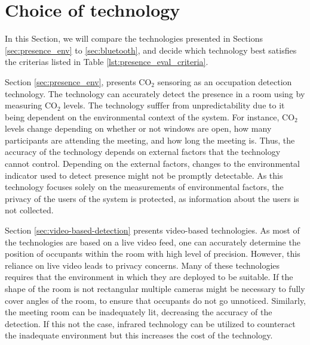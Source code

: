 \section{Choice of technology}
In this Section, we will compare the technologies presented in Sections \ref{sec:presence_env} to \ref{sec:bluetooth}, and decide which technology best satisfies the criterias listed in Table \ref{lst:presence_eval_criteria}. 

Section \ref{sec:presence_env}, presents $\text{CO}_{2}$ sensoring as an occupation detection technology. The technology can accurately detect the presence in a room using by measuring $\text{CO}_{2}$ levels.
The technology sufffer from unpredictability due to it being dependent on the environmental context of the system.
For instance, $\text{CO}_{2}$ levels change depending on whether or not windows are open, how many participants are attending the meeting, and how long the meeting is.
Thus, the accuracy of the technology depends on external factors that the technology cannot control.
Depending on the external factors, changes to the environmental indicator used to detect presence might not be promptly detectable.
As this technology focuses solely on the measurements of environmental factors, the privacy of the users of the system is protected, as information about the users is not collected.

Section \ref{sec:video-based-detection} presents video-based technologies.
As most of the technologies are based on a live video feed, one can accurately determine the position of occupants within the room with high level of precision. 
However, this reliance on live video leads to privacy concerns.
Many of these technologies requires that the environment in which they are deployed to be suitable.
If the shape of the room is not rectangular multiple cameras might be necessary to fully cover angles of the room, to ensure that occupants do not go unnoticed. 
Similarly, the meeting room can be inadequately lit, decreasing the accuracy of the detection.
If this not the case, infrared technology can be utilized to counteract the inadequate environment but this increases the cost of the technology.   

